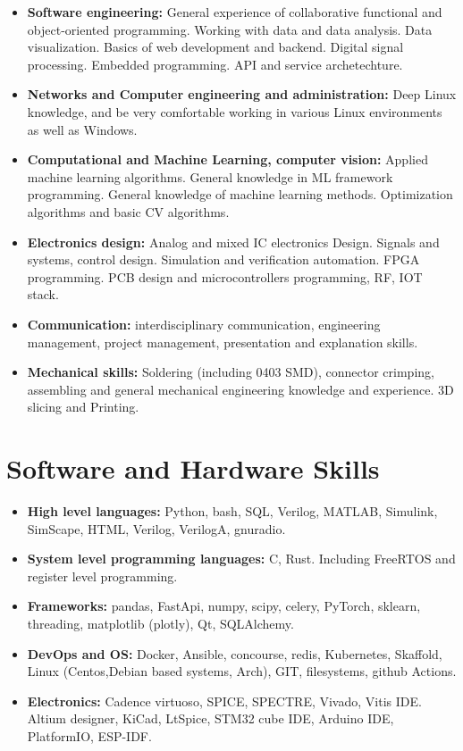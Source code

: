 \documentclass{article}
\begin{document}
\begin{itemize}

   \item \textbf{Software engineering:} General experience of collaborative functional and object-oriented programming. Working with data and data analysis. Data visualization. Basics of web development and backend. Digital signal processing. Embedded programming. API and service archetechture.
   \item \textbf{Networks and Computer engineering and administration:} Deep Linux knowledge, and be very comfortable working in various Linux environments as well as Windows.
   \item \textbf{Computational and Machine Learning, computer vision:} Applied machine learning algorithms. General knowledge in ML framework programming. General knowledge of machine learning methods. Optimization algorithms and basic CV algorithms.
   \item \textbf{Electronics design:} Analog and mixed IC electronics Design. Signals and systems, control design. Simulation and verification automation. FPGA programming. PCB design and microcontrollers programming, RF, IOT stack.
   \item \textbf{Communication:} interdisciplinary communication, engineering management, project management, presentation and explanation skills.
   \item \textbf{Mechanical skills:} Soldering (including 0403 SMD), connector crimping,  assembling and general mechanical engineering knowledge and experience. 3D slicing and Printing.
\end{itemize}

\section{Software and Hardware Skills}

\begin{itemize}

   \item \textbf{High level languages:} Python, bash, SQL, Verilog, MATLAB, Simulink, SimScape, HTML, Verilog, VerilogA, gnuradio.
   \item \textbf{System level programming languages:} C, Rust. Including FreeRTOS and register level programming.
   \item \textbf{Frameworks:} pandas, FastApi, numpy, scipy, celery, PyTorch, sklearn, threading, matplotlib (plotly), Qt, SQLAlchemy.
   \item \textbf{DevOps and OS:} Docker, Ansible, concourse, redis, Kubernetes, Skaffold, Linux (Centos,Debian based systems, Arch), GIT, filesystems, github Actions.
   \item \textbf{Electronics:} Cadence virtuoso, SPICE, SPECTRE, Vivado, Vitis IDE. Altium designer, KiCad, LtSpice, STM32 cube IDE, Arduino IDE, PlatformIO, ESP-IDF.

\end{itemize}
\end{document}
